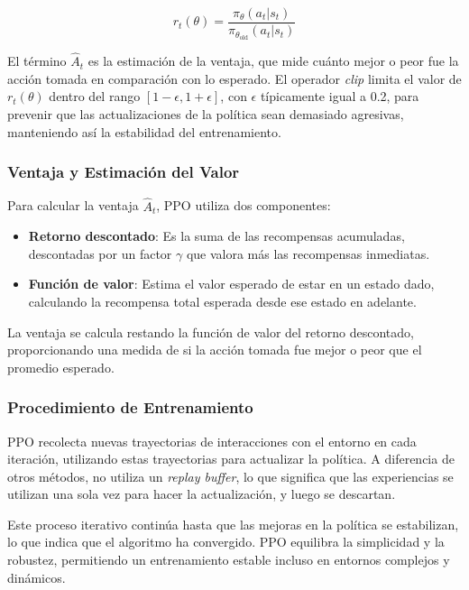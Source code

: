 \documentclass[a4paper,12pt, twoside]{report}
\begin{document}
\begin{equation}
r_t(\theta) = \frac{\pi_\theta(a_t|s_t)}{\pi_{\theta_{\text{old}}}(a_t|s_t)}
\end{equation}

El término \(\hat{A}_t\) es la estimación de la ventaja, que mide cuánto mejor o peor fue la 
acción tomada en comparación con lo esperado. El operador \textit{clip} limita el valor de 
\(r_t(\theta)\) dentro del rango \([1 - \epsilon, 1 + \epsilon]\), con \(\epsilon\) típicamente 
igual a 0.2, para prevenir que las actualizaciones de la política sean demasiado agresivas,
manteniendo así la estabilidad del entrenamiento.

\subsubsection{Ventaja y Estimación del Valor}

Para calcular la ventaja \(\hat{A}_t\), PPO utiliza dos componentes:

\begin{itemize}
    \item \textbf{Retorno descontado}: Es la suma de las recompensas acumuladas, descontadas 
    por un factor \(\gamma\) que valora más las recompensas inmediatas.
    \item \textbf{Función de valor}: Estima el valor esperado de estar en un estado dado, 
    calculando la recompensa total esperada desde ese estado en adelante.
\end{itemize}

La ventaja se calcula restando la función de valor del retorno descontado, proporcionando 
una medida de si la acción tomada fue mejor o peor que el promedio esperado.

\subsubsection{Procedimiento de Entrenamiento}

PPO recolecta nuevas trayectorias de interacciones con el entorno en cada iteración, 
utilizando estas trayectorias para actualizar la política. A diferencia de otros métodos, 
no utiliza un \textit{replay buffer}, lo que significa que las experiencias se utilizan 
una sola vez para hacer la actualización, y luego se descartan.

Este proceso iterativo continúa hasta que las mejoras en la política se estabilizan, 
lo que indica que el algoritmo ha convergido. PPO equilibra la simplicidad y la robustez, 
permitiendo un entrenamiento estable incluso en entornos complejos y dinámicos.
\end{document}
